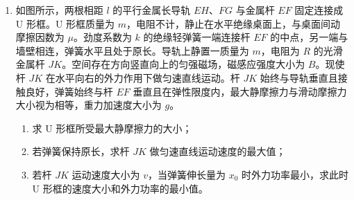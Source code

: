 \documentclass[\gkver]{gaokaozhenti}
\begin{document}
\begin{enumerate}
\item
如图所示，两根相距 $l$ 的平行金属长导轨 $EH$、$FG$ 与金属杆 $EF$ 固定连接成 U 形框。U 形框质量为 $m$，电阻不计，静止在水平绝缘桌面上，与桌面间动摩擦因数为 $\mu$。劲度系数为 $k$ 的绝缘轻弹簧一端连接杆 $EF$ 的中点，另一端与墙壁相连，弹簧水平且处于原长。导轨上静置一质量为 $m$，电阻为 $R$ 的光滑金属杆 $JK$。空间存在方向竖直向上的匀强磁场，磁感应强度大小为 $B$。现使杆 $JK$ 在水平向右的外力作用下做匀速直线运动。杆 $JK$ 始终与导轨垂直且接触良好，弹簧始终与杆 $EF$ 垂直且在弹性限度内，最大静摩擦力与滑动摩擦力大小视为相等，重力加速度大小为 $g$。
\begin{enumerate}
\item
求 U 形框所受最大静摩擦力的大小；
\item
若弹簧保持原长，求杆 $JK$ 做匀速直线运动速度的最大值；
\item
若杆 $JK$ 运动速度大小为 $v$，当弹簧伸长量为 $x_{0}$ 时外力功率最小，求此时 U 形框的速度大小和外力功率的最小值。
\end{enumerate}


\end{enumerate}
\end{document}
